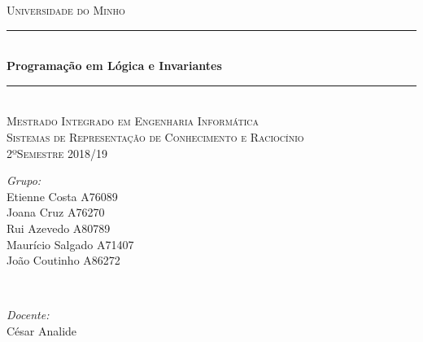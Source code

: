 \documentclass[25pt]{article}
\begin{document}
\begin{titlepage}

\newcommand{\HRule}{\rule{\linewidth}{0.5mm}} %

\center %


\textsc{\LARGE Universidade do Minho}\\[1.5cm]
\HRule \\[0.4cm]
{ \huge \bfseries Programação em Lógica e Invariantes}\\[0.4cm]
\HRule \\[1.5cm]
\textsc{\Large Mestrado Integrado em Engenharia Informática}\\[0.5cm]
\textsc{\large Sistemas de Representação de Conhecimento e Raciocínio}\\[0.5cm]
\textsc{\large 2ºSemestre 2018/19}\\[0.5cm]



\begin{minipage}{0.4\textwidth}
\begin{flushleft} \large
\emph{Grupo:}\\
Etienne Costa A76089 \\
Joana Cruz A76270 \\
Rui Azevedo A80789 \\
Maurício Salgado A71407 \\
João Coutinho A86272 \\
\end{flushleft}
\end{minipage}
~
\begin{minipage}{0.4\textwidth}
\begin{flushright} \large
\emph{Docente:} \\
César Analide\\
\end{flushright}
\end{minipage}\\[2cm]



\end{titlepage}
\end{document}
